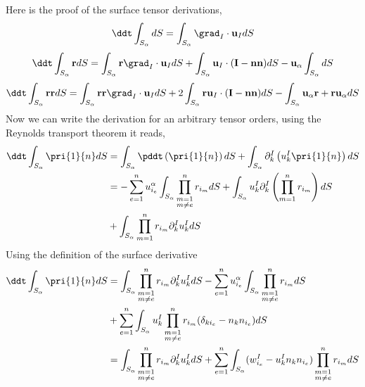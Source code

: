 Here is the proof of the surface tensor derivations,
\begin{equation*}
    \ddt \int_{S_\alpha} dS 
    = \int_{S_\alpha} \grad_I \cdot \textbf{u}_I dS
\end{equation*}
\begin{equation*}
    \ddt \int_{S_\alpha} \textbf{r} dS 
    = \int_{S_\alpha} \textbf{r} \grad_I \cdot \textbf{u}_I dS
    + \int_{S_\alpha} \textbf{u}_I  \cdot (\textbf{I}-\textbf{nn}) dS
    - \textbf{u}_\alpha \int_{S_\alpha} dS
\end{equation*}
\begin{equation*}
    \ddt \int_{S_\alpha} \textbf{rr} dS 
    = \int_{S_\alpha} \textbf{rr} \grad_I \cdot \textbf{u}_I dS
    + 2 \int_{S_\alpha}\textbf{r} \textbf{u}_I  \cdot (\textbf{I}-\textbf{nn}) dS
    - \int_{S_\alpha} \textbf{u}_\alpha \textbf{r} + \textbf{r}  \textbf{u}_\alpha dS
\end{equation*}
Now we can write the derivation for an arbitrary tensor orders, using the Reynolds transport theorem it reads, 
\begin{align*}
    \ddt \int_{S_\alpha} \pri{1}{n}dS
    &= \int_{S_\alpha} \pddt \left(
        \pri{1}{n}
    \right) dS
    + \int_{S_\alpha} 
    \partial_k^I  \left(
        u^I_k \pri{1}{n}
    \right)dS \\
    &= - \sum_{e=1}^n u^\alpha_{i_e} \int_{S_\alpha} 
        \prod_{\substack{m = 1 \\m \neq e}}^{n} r_{i_m}
     dS
    + \int_{S_\alpha} u^I_k
    \partial_k^I  \left(
         \prod_{m=1}^{n} r_{i_m}
    \right)dS \\
    &+ \int_{S_\alpha} 
    \prod_{m=1}^{n} r_{i_m}
    \partial_k^I u^I_k 
    dS \\
\end{align*}
Using the definition of the surface derivative
\begin{align*}
    \ddt \int_{S_\alpha} \pri{1}{n}dS
    &= \int_{S_\alpha} 
    \prod_{\substack{m = 1 \\m \neq e}}^{n} r_{i_m}
    \partial_k^I u^I_k 
    dS 
    - \sum_{e=1}^n u^\alpha_{i_e} \int_{S_\alpha} 
    \prod_{\substack{m = 1 \\m \neq e}}^{n} r_{i_m}dS \\
    &+ \sum_{e=1}^n \int_{S_\alpha} u^I_k
    \prod_{\substack{m = 1 \\m \neq e}}^{n} r_{i_m}
    (\delta_{ki_e} - n_kn_{i_e}) dS \\
    &= \int_{S_\alpha} 
    \prod_{\substack{m = 1 \\m \neq e}}^{n} r_{i_m}
    \partial_k^I u^I_k dS 
    + \sum_{e=1}^n  \int_{S_\alpha} (w^I_{i_e} - u^I_kn_kn_{i_e}) 
    \prod_{\substack{m = 1 \\m \neq e}}^{n} r_{i_m}dS \\
\end{align*}
